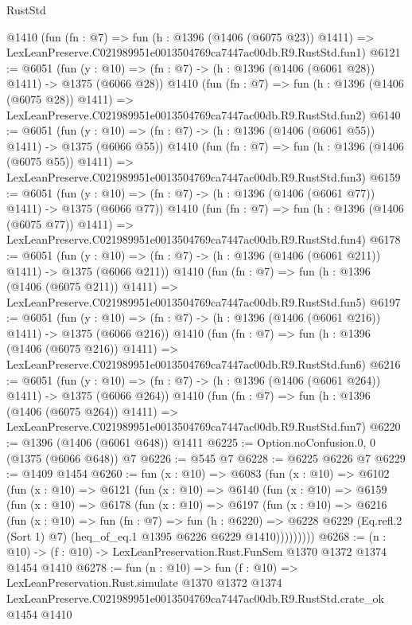 \begin{lexlean}{RustStd}
\begin{coremodule}
    @1410
    (fun (fn : @7) =>
    fun (h : @1396 (@1406 (@6075 @23)) @1411) =>
    LexLeanPreserve.C021989951e0013504769ca7447ac00db.R9.RustStd.fun1)
@6121 := @6051
    (fun (y : @10) => (fn : @7) -> (h : @1396 (@1406 (@6061 @28)) @1411) -> @1375 (@6066 @28))
    @1410
    (fun (fn : @7) =>
    fun (h : @1396 (@1406 (@6075 @28)) @1411) =>
    LexLeanPreserve.C021989951e0013504769ca7447ac00db.R9.RustStd.fun2)
@6140 := @6051
    (fun (y : @10) => (fn : @7) -> (h : @1396 (@1406 (@6061 @55)) @1411) -> @1375 (@6066 @55))
    @1410
    (fun (fn : @7) =>
    fun (h : @1396 (@1406 (@6075 @55)) @1411) =>
    LexLeanPreserve.C021989951e0013504769ca7447ac00db.R9.RustStd.fun3)
@6159 := @6051
    (fun (y : @10) => (fn : @7) -> (h : @1396 (@1406 (@6061 @77)) @1411) -> @1375 (@6066 @77))
    @1410
    (fun (fn : @7) =>
    fun (h : @1396 (@1406 (@6075 @77)) @1411) =>
    LexLeanPreserve.C021989951e0013504769ca7447ac00db.R9.RustStd.fun4)
@6178 := @6051
    (fun (y : @10) => (fn : @7) -> (h : @1396 (@1406 (@6061 @211)) @1411) -> @1375 (@6066 @211))
    @1410
    (fun (fn : @7) =>
    fun (h : @1396 (@1406 (@6075 @211)) @1411) =>
    LexLeanPreserve.C021989951e0013504769ca7447ac00db.R9.RustStd.fun5)
@6197 := @6051
    (fun (y : @10) => (fn : @7) -> (h : @1396 (@1406 (@6061 @216)) @1411) -> @1375 (@6066 @216))
    @1410
    (fun (fn : @7) =>
    fun (h : @1396 (@1406 (@6075 @216)) @1411) =>
    LexLeanPreserve.C021989951e0013504769ca7447ac00db.R9.RustStd.fun6)
@6216 := @6051
    (fun (y : @10) => (fn : @7) -> (h : @1396 (@1406 (@6061 @264)) @1411) -> @1375 (@6066 @264))
    @1410
    (fun (fn : @7) =>
    fun (h : @1396 (@1406 (@6075 @264)) @1411) =>
    LexLeanPreserve.C021989951e0013504769ca7447ac00db.R9.RustStd.fun7)
@6220 := @1396 (@1406 (@6061 @648)) @1411
@6225 := Option.noConfusion.{0, 0} (@1375 (@6066 @648)) @7
@6226 := @545 @7
@6228 := @6225 @6226 @7
@6229 := @1409 @1454
@6260 := fun (x : @10) =>
  @6083
    (fun (x : @10) =>
    @6102
      (fun (x : @10) =>
      @6121
        (fun (x : @10) =>
        @6140
          (fun (x : @10) =>
          @6159
            (fun (x : @10) =>
            @6178
              (fun (x : @10) =>
              @6197
                (fun (x : @10) =>
                @6216
                  (fun (x : @10) =>
                  fun (fn : @7) =>
                  fun (h : @6220) =>
                  @6228
                    @6229
                    (Eq.refl.{2} (Sort 1) @7)
                    (heq_of_eq.{1} @1395 @6226 @6229 @1410)))))))))
@6268 := (n : @10) -> (f : @10) -> LexLeanPreservation.Rust.FunSem @1370 @1372 @1374 @1454 @1410
@6278 := fun (n : @10) =>
  fun (f : @10) =>
  LexLeanPreservation.Rust.simulate
    @1370
    @1372
    @1374
    LexLeanPreserve.C021989951e0013504769ca7447ac00db.R9.RustStd.crate_ok
    @1454
    @1410
\end{coremodule}
\end{lexlean}
